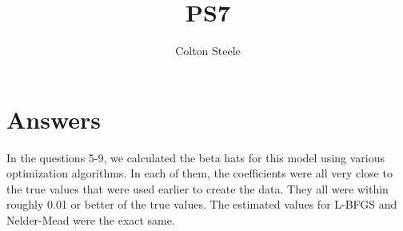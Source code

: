 \documentclass{article}
\title{PS7}
\author{Colton Steele}
\begin{document}
\maketitle


\section{Answers}

In the questions 5-9, we calculated the beta hats for this model using various optimization algorithms. In each of them, the coefficients were all very close to the true values that were used earlier to create the data. They all were within roughly 0.01 or better of the true values. The estimated values for L-BFGS and Nelder-Mead were the exact same.


\end{document}
